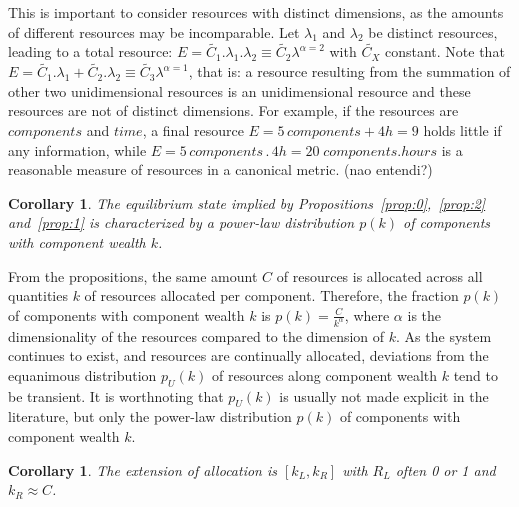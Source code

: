 \documentclass[a4paper, 11pt]{article} %
\newtheorem{corollary}[theorem2]{Corollary}
\begin{document}
This is important to consider resources with distinct dimensions, as the amounts of different resources may be incomparable. Let $\lambda_1$ and $\lambda_2$ be distinct resources, leading to a total 
resource: $E=\widetilde{C_1} . \lambda_1 . \lambda_2 \equiv \widetilde{C_2}\lambda^{\alpha=2}$
with $\widetilde{C_X}$ constant.
Note that $E=\widetilde{C_1} . \lambda_1 + \widetilde{C_2}.\lambda_2 \equiv \widetilde{C_3}\lambda^{\alpha=1}$, that is: a resource resulting from the summation of other two unidimensional resources is an unidimensional resource and these resources are not of distinct dimensions.
For example, if the resources are $components$ and $time$,
a final resource $E=5\, components + 4h=9$
holds little if any information, while
$E= 5\, components \, . \, 4 h= 20\; components . hours$ is
a reasonable measure of resources in a canonical metric. (nao entendi?)


\begin{corollary}\label{prop:3}
	The equilibrium state implied by Propositions~\ref{prop:0},~\ref{prop:2} and~\ref{prop:1} is characterized by a power-law distribution $p(k)$ of components with component wealth $k$.
\end{corollary}

From the propositions, the same amount $C$ of resources is allocated
across all quantities $k$ of resources allocated per component.
Therefore, the fraction $p(k)$ of components with component wealth $k$ is
$p(k)=\frac{C}{k^\alpha}$, where $\alpha$ is
the dimensionality of the resources compared to the dimension of $k$.
As the system continues to exist,
and resources are continually allocated, deviations from the equanimous
distribution $p_U(k)$ of resources along component wealth $k$
 tend to be transient.
 It is worthnoting that $p_U(k)$ is usually not made explicit in the literature, but only the power-law distribution $p(k)$ of components
with component wealth $k$.

 \begin{corollary}\label{cor:2}
	The extension of allocation is $[k_L,k_R]$ with $R_L$ often 0 or 1 and $k_R\approx C$.
\end{corollary}
\end{document}

